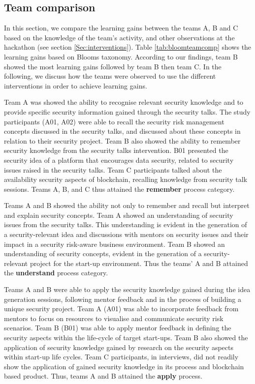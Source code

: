 \documentclass[runningheads]{llncs}
\begin{document}
\subsection{Team comparison} \label{teamcomparison}
In this section, we compare the learning gains between the teams A, B and C based on the knowledge of the team's activity, and other observations at the hackathon (see section \ref{Sec:interventions}). Table \ref{tab:bloomteamcomp} shows the learning gains based on Blooms taxonomy.
According to our findings, team B showed the most learning gains followed by team B then team C. In the following, we discuss how the teams were observed to use the different interventions in order to achieve learning gains.

Team A was showed the ability to recognise relevant security knowledge and to provide specific security information gained through the security talks. The study participants (A01, A02) were able to recall the security risk management concepts discussed in the security talks, and discussed about these concepts in relation to their security project. 
Team B also showed the ability to remember security knowledge from the security talks intervention. B01 presented the security idea of a platform that encourages data security, related to security issues raised in the security talks. Team C participants talked about the availability security aspects of blockchain, recalling knowledge from security talk sessions. Teams A, B, and C thus attained the \textbf{remember} process category.

Teams A and B showed the ability not only to remember and recall but interpret and explain security concepts. Team A showed an understanding of security issues from the security talks. This understanding is evident in the generation of a security-relevant idea and discussions with mentors on security issues and their impact in a security risk-aware business environment. Team B showed an understanding of security concepts, evident in the generation of a security-relevant project for the start-up environment. Thus the teams' A and B attained the \textbf{understand} process category.

Teams A and B were able to apply the security knowledge gained during the idea generation sessions, following mentor feedback and in the process of building a unique security project.
Team A (A01) was able to incorporate feedback from mentors to focus on resources to visualise and communicate security risk scenarios. Team B (B01) was able to apply mentor feedback in defining the security aspects within the life-cycle of target start-ups. Team B also showed the application of security knowledge gained by research on the security aspects within start-up life cycles. Team C participants, in interviews, did not readily show the application of gained security knowledge in its process and blockchain based product. Thus, teams A and B attained the \textbf{apply} process.
\end{document}
